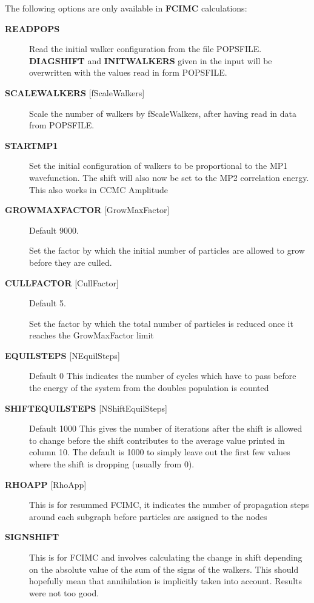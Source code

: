 \documentclass[openany,a4paper,10pt,english]{manual}
\begin{document}
The following options are only available in \textbf{FCIMC} calculations:
\begin{description}
\item[\textbf{READPOPS}] \leavevmode
Read the initial walker configuration from the file POPSFILE.
\textbf{DIAGSHIFT} and \textbf{INITWALKERS} given in the input will be
overwritten with the values read in form POPSFILE.

\item[\textbf{SCALEWALKERS} {[}fScaleWalkers{]}] \leavevmode
Scale the number of walkers by fScaleWalkers, after having read in data from POPSFILE.

\item[\textbf{STARTMP1}] \leavevmode
Set the initial configuration of walkers to be proportional to the MP1 wavefunction. The shift will also
now be set to the MP2 correlation energy.  This also works in CCMC Amplitude

\item[\textbf{GROWMAXFACTOR} {[}GrowMaxFactor{]}] \leavevmode
Default 9000.

Set the factor by which the initial number of particles are allowed to grow before
they are culled.

\item[\textbf{CULLFACTOR} {[}CullFactor{]}] \leavevmode
Default 5.

Set the factor by which the total number of particles is reduced once it reaches the GrowMaxFactor limit

\item[\textbf{EQUILSTEPS} {[}NEquilSteps{]}] \leavevmode
Default 0
This indicates the number of cycles which have to
pass before the energy of the system from the doubles
population is counted

\item[\textbf{SHIFTEQUILSTEPS} {[}NShiftEquilSteps{]}] \leavevmode
Default 1000
This gives the number of iterations after the shift is allowed to change before the shift
contributes to the average value printed in column 10.
The default is 1000 to simply leave out the first few values where the shift is dropping (usually from 0).

\item[\textbf{RHOAPP} {[}RhoApp{]}] \leavevmode
This is for resummed FCIMC, it indicates the number of propagation steps
around each subgraph before particles are assigned to the nodes

\item[\textbf{SIGNSHIFT}] \leavevmode
This is for FCIMC and involves calculating the change in shift depending on
the absolute value of the sum of the signs of the walkers.  This should
hopefully mean that annihilation is implicitly taken into account. Results
were not too good.


\end{description}
\end{document}

